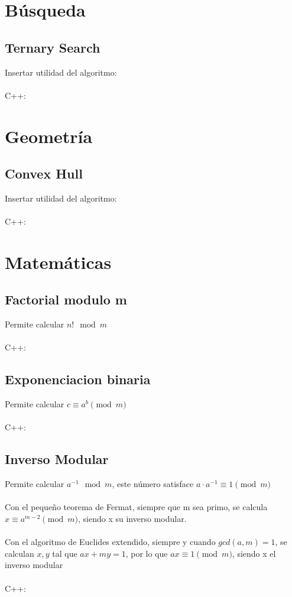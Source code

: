 \documentclass{article}
\begin{document}
\section{Búsqueda}
    \subsection{Ternary Search}
        Insertar utilidad del algoritmo:
        \\ \\
        C++:
        
\pagebreak
\section{Geometría}
    \subsection{Convex Hull}
        Insertar utilidad del algoritmo:
        \\ \\
        C++:
        
\pagebreak
\section{Matemáticas}
    \subsection{Factorial modulo m}
        Permite calcular $n! \mod{m}$
        \\ \\
        C++:
        
    \subsection{Exponenciacion binaria}
        Permite calcular $c \equiv a^b\pmod{m}$
        \\ \\
        C++:
        

    \subsection{Inverso Modular}
        Permite calcular $ a^{-1} \mod{m}$, este número satisface $a \cdot a^{-1} \equiv 1 \pmod{m}$
        \\ \\
        Con el pequeño teorema de Fermat, siempre que m sea primo, se calcula $x \equiv a^{m - 2} \pmod{m}$, siendo x su inverso modular.
        \\ \\
        Con el algoritmo de Euclides extendido, siempre y cuando $gcd(a, m) = 1$, se calculan $x, y$ tal que $ ax + my = 1$, por lo que
        $ax \equiv 1 \pmod{m}$, siendo x el inverso modular 
        \\ \\
        C++:
        
\end{document}
